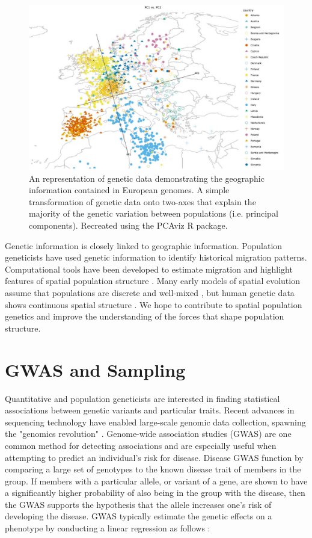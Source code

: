 \begin{figure}[h]
    \centering
    \includegraphics[scale = 0.45]{img/novembre_pca.JPG}
    \caption{An representation of genetic data demonstrating the geographic information contained in European genomes. A simple transformation of genetic data onto two-axes that explain the majority of the genetic variation between populations (i.e. principal components). Recreated using the PCAviz R package. \cite{pcaviz}}
    \label{fig:novembre_pca}
\end{figure}

Genetic information is closely linked to geographic information. Population geneticists have used genetic information to identify historical migration patterns. Computational tools have been developed to estimate migration and highlight features of spatial population structure \cite{petkova_visualizing_2016}. Many early models of spatial evolution assume that populations are discrete and well-mixed \cite{sigwart_coalescent_2009} \cite{kingman_coalescent_1982}, but human genetic data shows continuous spatial structure \cite{novembre_interpreting_2008}. We hope to contribute to spatial population genetics and improve the understanding of the forces that shape population structure.


\section{GWAS and Sampling}
Quantitative and population geneticists are interested in finding statistical associations between genetic variants and particular traits. Recent advances in sequencing technology have enabled large-scale genomic data collection, spawning the "genomics revolution" \cite{lander_initial_2001}. Genome-wide association studies (GWAS) are one common method for detecting associations and are especially useful when attempting to predict an individual’s risk for disease. Disease GWAS function by comparing a large set of genotypes to the known disease trait of members in the group. If members with a particular allele, or variant of a gene, are shown to have a significantly higher probability of also being in the group with the disease, then the GWAS supports the hypothesis that the allele increases one’s risk of developing the disease. GWAS typically estimate the genetic effects on a phenotype by conducting a linear regression as follows \cite{dudbridge_power_2013} \cite{xie_efficiency_1998}:

